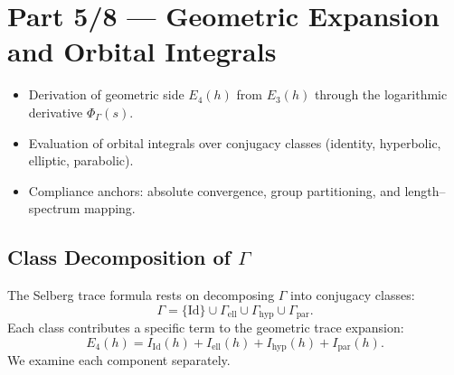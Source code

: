 
\section*{Part 5/8 — Geometric Expansion and Orbital Integrals}\relax\hspace{0pt}

\begin{tcolorbox}[colback=gray!4,colframe=gray!45,title={Scope • C10–C12 (Geometric Side)}] %
\begin{itemize}
  \item Derivation of geometric side $E_{4}(h)$ from $E_{3}(h)$ through the logarithmic derivative $\Phi_\Gamma(s)$. %
  \item Evaluation of orbital integrals over conjugacy classes (identity, hyperbolic, elliptic, parabolic). %
  \item Compliance anchors: absolute convergence, group partitioning, and length–spectrum mapping. %
\end{itemize}
\end{tcolorbox}

\subsection{Class Decomposition of $\Gamma$}\relax\hspace{0pt}
\label{subsec:class-decomp}\relax\hspace{0pt}

The Selberg trace formula rests on decomposing $\Gamma$ into conjugacy classes:
\[
\Gamma = \{\text{Id}\} \cup \Gamma_{\mathrm{ell}} \cup \Gamma_{\mathrm{hyp}} \cup \Gamma_{\mathrm{par}}.
\]
Each class contributes a specific term to the geometric trace expansion:
\[
E_4(h) = I_{\mathrm{Id}}(h) + I_{\mathrm{ell}}(h) + I_{\mathrm{hyp}}(h) + I_{\mathrm{par}}(h).
\]
We examine each component separately. %


